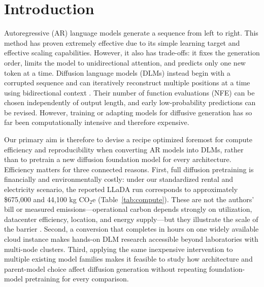 \documentclass{article}
\begin{document}
\section{Introduction}

Autoregressive (AR) language models generate a sequence from left to right. This method has proven extremely effective due to its simple learning target and effective scaling capabilities. However, it also has trade-offs: it fixes the generation order, limits the model to unidirectional attention, and predicts only one new token at a time. Diffusion language models (DLMs) instead begin with a corrupted sequence and can iteratively reconstruct multiple positions at a time using bidirectional context \citep{austin2021structured,sahoo2024simple,shi2024simplified}. Their number of function evaluations (NFE) can be chosen independently of output length, and early low-probability predictions can be revised. However, training or adapting models for diffusive generation has so far been computationally intensive and therefore expensive.

Our primary aim is therefore to devise a recipe optimized foremost for compute efficiency and reproducibility when converting AR models into DLMs, rather than to pretrain a new diffusion foundation model for every architecture. Efficiency matters for three connected reasons. First, full diffusion pretraining is financially and environmentally costly: under our standardized rental and electricity scenario, the reported LLaDA run corresponds to approximately \$675,000 and 44,100 kg CO$_2$e (Table~\ref{tab:compute}). These are not the authors' bill or measured emissions---operational carbon depends strongly on utilization, datacenter efficiency, location, and energy supply---but they illustrate the scale of the barrier \citep{strubell2019energy,patterson2021carbon}. Second, a conversion that completes in hours on one widely available cloud instance makes hands-on DLM research accessible beyond laboratories with multi-node clusters. Third, applying the same inexpensive intervention to multiple existing model families makes it feasible to study how architecture and parent-model choice affect diffusion generation without repeating foundation-model pretraining for every comparison.
\end{document}
